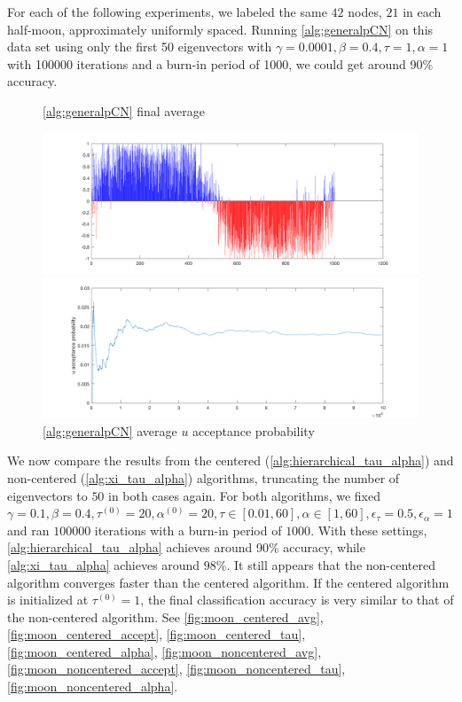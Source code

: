 \documentclass{siamart1116}
\begin{document}
For each of the following experiments, we labeled the same $42$ nodes, $21$ in each half-moon, approximately uniformly spaced. Running \cref{alg:generalpCN} on this data set using only the first 50 eigenvectors with $\gamma=0.0001,\beta=0.4,\tau=1,\alpha=1$ with 100000 iterations and a burn-in period of 1000, we could get around 90\% accuracy.
\begin{figure}[!htb]
    \begin{minipage}{0.48\textwidth}
        \centering
        \caption{\label{fig:moon_mcmc_gamma_avg} \cref{alg:generalpCN} final average}
        \includegraphics[width=\linewidth]{graphics/moons/mcmc_gamma/u_avg.png}
    \end{minipage} \hfill
    \begin{minipage}{0.48\textwidth}
        \centering
        \caption{\label{fig:moon_mcmc_gamma_accept} \cref{alg:generalpCN} average $u$ acceptance probability}
        \includegraphics[width=\linewidth]{graphics/moons/mcmc_gamma/u_accept.png}
    \end{minipage}
\end{figure}

We now compare the results from the centered (\cref{alg:hierarchical_tau_alpha}) and non-centered (\cref{alg:xi_tau_alpha}) algorithms, truncating the number of eigenvectors to $50$ in both cases again. For both algorithms, we fixed $\gamma = 0.1, \beta = 0.4, \tau^{(0)}=20,\alpha^{(0)}=20,\tau\in[0.01,60],\alpha\in[1,60],\epsilon_\tau=0.5,\epsilon_\alpha=1$ and ran $100000$ iterations with a burn-in period of $1000$. With these settings, \cref{alg:hierarchical_tau_alpha} achieves around 90\% accuracy, while \cref{alg:xi_tau_alpha} achieves around 98\%. It still appears that the non-centered algorithm converges faster than the centered algorithm. If the centered algorithm is initialized at $\tau^{(0)} = 1$, the final classification accuracy is very similar to that of the non-centered algorithm. See \cref{fig:moon_centered_avg}, \cref{fig:moon_centered_accept}, \cref{fig:moon_centered_tau}, \cref{fig:moon_centered_alpha}, \cref{fig:moon_noncentered_avg}, \cref{fig:moon_noncentered_accept}, \cref{fig:moon_noncentered_tau}, \cref{fig:moon_noncentered_alpha}.
\end{document}
